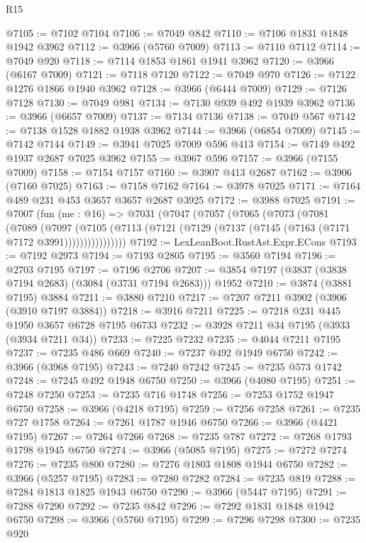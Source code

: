 \begin{lexlean}{R15}
\begin{coremodule}
@7105 := @7102 @7104
@7106 := @7049 @842
@7110 := @7106 @1831 @1848 @1942 @3962
@7112 := @3966 (@5760 @7009)
@7113 := @7110 @7112
@7114 := @7049 @920
@7118 := @7114 @1853 @1861 @1941 @3962
@7120 := @3966 (@6167 @7009)
@7121 := @7118 @7120
@7122 := @7049 @970
@7126 := @7122 @1276 @1866 @1940 @3962
@7128 := @3966 (@6444 @7009)
@7129 := @7126 @7128
@7130 := @7049 @981
@7134 := @7130 @939 @492 @1939 @3962
@7136 := @3966 (@6657 @7009)
@7137 := @7134 @7136
@7138 := @7049 @567
@7142 := @7138 @1528 @1882 @1938 @3962
@7144 := @3966 (@6854 @7009)
@7145 := @7142 @7144
@7149 := @3941 @7025 @7009 @596 @413
@7154 := @7149 @492 @1937 @2687 @7025 @3962
@7155 := @3967 @596
@7157 := @3966 (@7155 @7009)
@7158 := @7154 @7157
@7160 := @3907 @413 @2687
@7162 := @3906 (@7160 @7025)
@7163 := @7158 @7162
@7164 := @3978 @7025
@7171 := @7164 @489 @231 @453 @3657 @3657 @2687 @3925
@7172 := @3988 @7025
@7191 := @7007
    (fun (me : @16) =>
    @7031
      (@7047
        (@7057
          (@7065
            (@7073
              (@7081
                (@7089
                  (@7097
                    (@7105
                      (@7113 (@7121 (@7129 (@7137 (@7145 (@7163 (@7171 @7172 @3991))))))))))))))))
@7192 := LexLeanBoot.RustAst.Expr.ECons
@7193 := @7192 @2973
@7194 := @7193 @2805
@7195 := @3560 @7194
@7196 := @2703 @7195
@7197 := @7196 @2706
@7207 := @3854 @7197 (@3837 (@3838 @7194 @2683) (@3084 (@3731 @7194 @2683))) @1952
@7210 := @3874 (@3881 @7195) @3884
@7211 := @3880 @7210
@7217 := @7207 @7211 @3902 (@3906 (@3910 @7197 @3884))
@7218 := @3916 @7211
@7225 := @7218 @231 @445 @1950 @3657 @6728 @7195 @6733
@7232 := @3928 @7211 @34 @7195 (@3933 (@3934 @7211 @34))
@7233 := @7225 @7232
@7235 := @4044 @7211 @7195
@7237 := @7235 @486 @669
@7240 := @7237 @492 @1949 @6750
@7242 := @3966 (@3968 @7195)
@7243 := @7240 @7242
@7245 := @7235 @573 @1742
@7248 := @7245 @492 @1948 @6750
@7250 := @3966 (@4080 @7195)
@7251 := @7248 @7250
@7253 := @7235 @716 @1748
@7256 := @7253 @1752 @1947 @6750
@7258 := @3966 (@4218 @7195)
@7259 := @7256 @7258
@7261 := @7235 @727 @1758
@7264 := @7261 @1787 @1946 @6750
@7266 := @3966 (@4421 @7195)
@7267 := @7264 @7266
@7268 := @7235 @787
@7272 := @7268 @1793 @1798 @1945 @6750
@7274 := @3966 (@5085 @7195)
@7275 := @7272 @7274
@7276 := @7235 @800
@7280 := @7276 @1803 @1808 @1944 @6750
@7282 := @3966 (@5257 @7195)
@7283 := @7280 @7282
@7284 := @7235 @819
@7288 := @7284 @1813 @1825 @1943 @6750
@7290 := @3966 (@5447 @7195)
@7291 := @7288 @7290
@7292 := @7235 @842
@7296 := @7292 @1831 @1848 @1942 @6750
@7298 := @3966 (@5760 @7195)
@7299 := @7296 @7298
@7300 := @7235 @920

\end{coremodule}
\end{lexlean}
